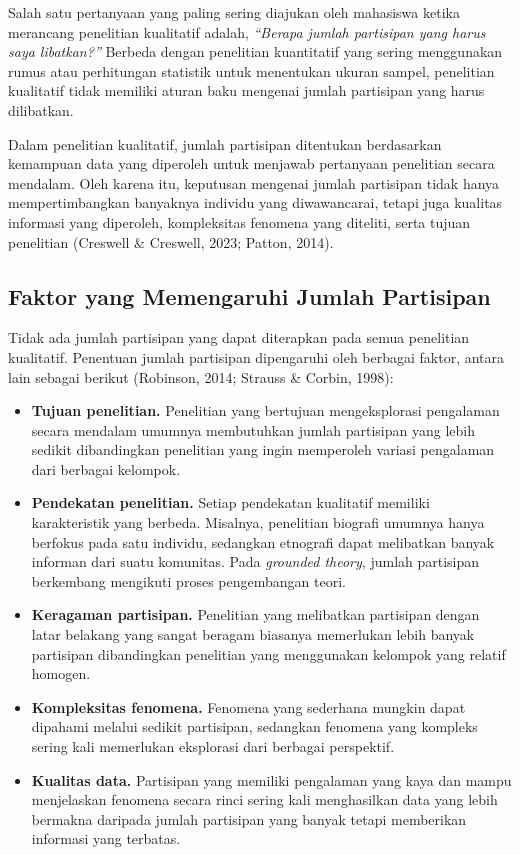 \documentclass[
  indonesian,
  letterpaper,
  DIV=11,
  numbers=noendperiod]{scrreprt}
\providecommand{\tightlist}{%
  \setlength{\itemsep}{0pt}\setlength{\parskip}{0pt}}
\begin{document}
Salah satu pertanyaan yang paling sering diajukan oleh mahasiswa ketika
merancang penelitian kualitatif adalah, \emph{``Berapa jumlah partisipan
yang harus saya libatkan?''} Berbeda dengan penelitian kuantitatif yang
sering menggunakan rumus atau perhitungan statistik untuk menentukan
ukuran sampel, penelitian kualitatif tidak memiliki aturan baku mengenai
jumlah partisipan yang harus dilibatkan.

Dalam penelitian kualitatif, jumlah partisipan ditentukan berdasarkan
kemampuan data yang diperoleh untuk menjawab pertanyaan penelitian
secara mendalam. Oleh karena itu, keputusan mengenai jumlah partisipan
tidak hanya mempertimbangkan banyaknya individu yang diwawancarai,
tetapi juga kualitas informasi yang diperoleh, kompleksitas fenomena
yang diteliti, serta tujuan penelitian (Creswell \& Creswell, 2023;
Patton, 2014).

\subsection{Faktor yang Memengaruhi Jumlah
Partisipan}\label{faktor-yang-memengaruhi-jumlah-partisipan}

Tidak ada jumlah partisipan yang dapat diterapkan pada semua penelitian
kualitatif. Penentuan jumlah partisipan dipengaruhi oleh berbagai
faktor, antara lain sebagai berikut (Robinson, 2014; Strauss \& Corbin,
1998):

\begin{itemize}
\tightlist
\item
  \textbf{Tujuan penelitian.} Penelitian yang bertujuan mengeksplorasi
  pengalaman secara mendalam umumnya membutuhkan jumlah partisipan yang
  lebih sedikit dibandingkan penelitian yang ingin memperoleh variasi
  pengalaman dari berbagai kelompok.
\item
  \textbf{Pendekatan penelitian.} Setiap pendekatan kualitatif memiliki
  karakteristik yang berbeda. Misalnya, penelitian biografi umumnya
  hanya berfokus pada satu individu, sedangkan etnografi dapat
  melibatkan banyak informan dari suatu komunitas. Pada \emph{grounded
  theory}, jumlah partisipan berkembang mengikuti proses pengembangan
  teori.
\item
  \textbf{Keragaman partisipan.} Penelitian yang melibatkan partisipan
  dengan latar belakang yang sangat beragam biasanya memerlukan lebih
  banyak partisipan dibandingkan penelitian yang menggunakan kelompok
  yang relatif homogen.
\item
  \textbf{Kompleksitas fenomena.} Fenomena yang sederhana mungkin dapat
  dipahami melalui sedikit partisipan, sedangkan fenomena yang kompleks
  sering kali memerlukan eksplorasi dari berbagai perspektif.
\item
  \textbf{Kualitas data.} Partisipan yang memiliki pengalaman yang kaya
  dan mampu menjelaskan fenomena secara rinci sering kali menghasilkan
  data yang lebih bermakna daripada jumlah partisipan yang banyak tetapi
  memberikan informasi yang terbatas.
\end{itemize}
\end{document}
